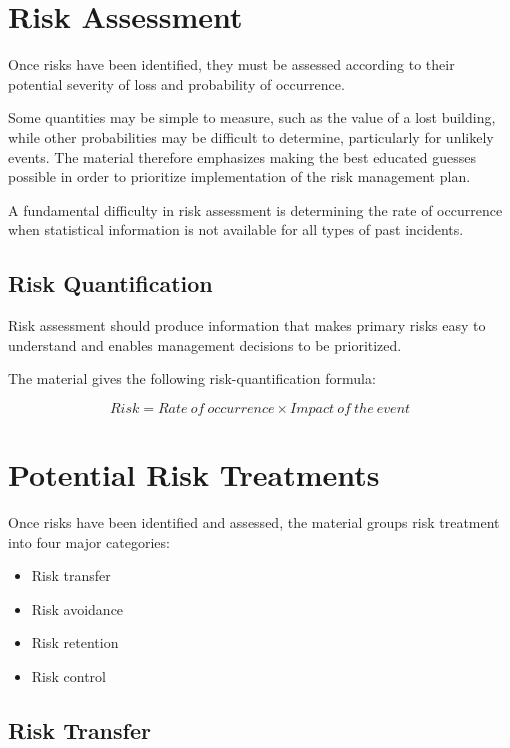 \documentclass[
]{book}
\providecommand{\tightlist}{%
  \setlength{\itemsep}{0pt}\setlength{\parskip}{0pt}}
\begin{document}
\section{Risk Assessment}\label{risk-assessment}

Once risks have been identified, they must be assessed according to their potential severity of loss and probability of occurrence.

Some quantities may be simple to measure, such as the value of a lost building, while other probabilities may be difficult to determine, particularly for unlikely events. The material therefore emphasizes making the best educated guesses possible in order to prioritize implementation of the risk management plan.

A fundamental difficulty in risk assessment is determining the rate of occurrence when statistical information is not available for all types of past incidents.

\subsection{Risk Quantification}\label{risk-quantification}

Risk assessment should produce information that makes primary risks easy to understand and enables management decisions to be prioritized.

The material gives the following risk-quantification formula:

\[
Risk = Rate\ of\ occurrence \times Impact\ of\ the\ event
\]

\section{Potential Risk Treatments}\label{potential-risk-treatments}

Once risks have been identified and assessed, the material groups risk treatment into four major categories:

\begin{itemize}
\tightlist
\item
  Risk transfer
\item
  Risk avoidance
\item
  Risk retention
\item
  Risk control
\end{itemize}

\subsection{Risk Transfer}\label{risk-transfer}
\end{document}
